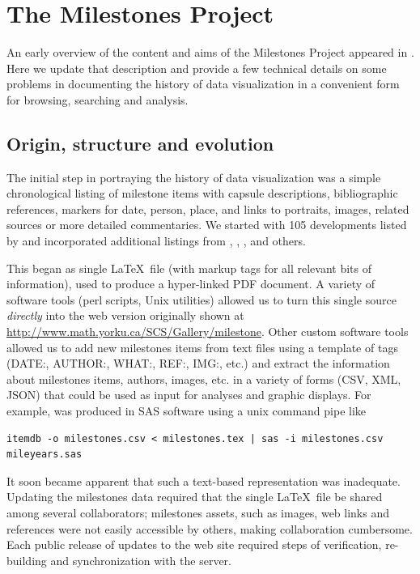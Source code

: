 \section{The Milestones Project}\label{sec:project}
An early overview of the content and aims of the Milestones Project appeared in \cite{Friendly:04:gfkl}.
Here we update that description and provide a few technical details on some problems in
documenting the history of data visualization in a convenient form for browsing, searching and
analysis.

\subsection{Origin, structure and evolution}\label{sec:structure}
The initial step in portraying the history of data visualization was a simple chronological listing of milestone items
with capsule descriptions, bibliographic references, markers for date, person, place, and links to portraits, images,
related sources or more detailed commentaries.
We started with 105
developments listed by \citet{BenigerRobyn:1978}
and incorporated additional listings from
\citet{Hankins:1999},  \citet{Tufte:1983,Tufte:1990,Tufte:1997},  \citet{Heiser:2000}, and others.

This began as single \LaTeX\ file (with markup tags for all relevant bits of information),
used to produce a
hyper-linked PDF document.  A variety of software tools (perl scripts, Unix utilities) allowed us to turn this
single source
\emph{directly} into the web version originally shown at
\url{http://www.math.yorku.ca/SCS/Gallery/milestone}.  Other custom software tools allowed us to
add new milestones items from text files using a template of tags (DATE:, AUTHOR:, WHAT:, REF:, IMG:, etc.)
and extract the
information about milestones items, authors, images, etc. in a variety of forms (CSV, XML, JSON)
that could be used as input for analyses and graphic displays.  For example, 
was produced in SAS software using a unix command pipe like
\begin{verbatim}
itemdb -o milestones.csv < milestones.tex | sas -i milestones.csv mileyears.sas
\end{verbatim}

It soon became apparent that such a text-based representation was inadequate. Updating the milestones data 
required that the single \LaTeX\ file be shared among several collaborators; milestones 
assets, such as images, web links and references were not easily accessible by others, making collaboration cumbersome. 
Each public release of updates to the web site required steps of verification, re-building and
synchronization with the server.

